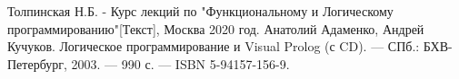 \newpage
{}

\begin{thebibliography}{}
      Толпинская Н.Б.  -  Курс лекций по "Функциональному и Логическому программированию"[Текст], Москва 2020 год.
      Анатолий Адаменко, Андрей Кучуков. Логическое программирование и Visual Prolog (с CD). — СПб.: БХВ-Петербург, 2003. — 990 с. — ISBN 5-94157-156-9.
\end{thebibliography}
